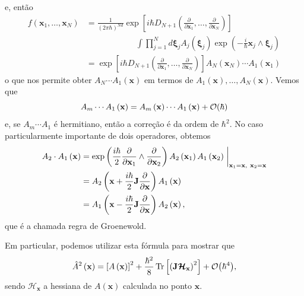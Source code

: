 \documentclass[
	12pt,
	oneside,			%
	a4paper,			%
	english,			%
	brazil				%
	]{abntex2}
\theoremstyle{definition}
\begin{document}
e, então
\begin{equation}
    \begin{aligned}
        f(\mathbf{x}_1,\ldots,\mathbf{x}_N) &= \frac{1}{\left(2 \pi \hbar\right)^{Nd}}\exp \left[i \hbar D_{N+1}\left(\frac{\partial}{\partial \mathbf{x}_1},\ldots,\frac{\partial}{\partial \mathbf{x}_N}\right)\right] \\ & \qquad \qquad \qquad \int \prod_{j=1}^N d \boldsymbol{\xi}_j A_j \left(\boldsymbol{\xi}_j\right) \exp\left(-\frac{i}{\hbar} \mathbf{x}_j\wedge\boldsymbol{\xi}_j\right) \\
        &=\exp \left[i \hbar D_{N+1}\left(\frac{\partial}{\partial \mathbf{x}_1},\ldots,\frac{\partial}{\partial \mathbf{x}_N}\right)\right] A_N\left(\mathbf{x}_N\right) \cdots A_1\left(\mathbf{x}_1\right)
    \end{aligned}
\end{equation}
o que nos permite obter $A_N \cdots A_1 \left(\mathbf{x}\right)$ em termos de $A_1\left(\mathbf{x}\right),\ldots,A_N\left(\mathbf{x}\right)$. Vemos que
\begin{equation}
    A_m \cdots A_1 \left(\mathbf{x}\right) = A_m \left( \mathbf{x} \right) \cdots A_1 \left( \mathbf{x} \right) + \order{\hbar}
\end{equation}
e, se $A_m \cdots A_1$ é hermitiano, então a correção é da ordem de $\hbar^2$.
No caso particularmente importante de dois operadores, obtemos
\begin{equation}
\label{groenewold}
    \begin{aligned}
        A_2 \cdot A_1 \left(\mathbf{x}\right) &= \exp\left(\frac{i \hbar}{2} \frac{\partial}{\partial \mathbf{x}_1} \wedge \frac{\partial}{\partial \mathbf{x}_2}\right) A_2\left(\mathbf{x}_1\right)  A_1\left(\mathbf{x}_2\right) \eval_{\mathbf{x}_1 = \mathbf{x},\ \mathbf{x}_2=\mathbf{x}}    \\ & =A_2\left(\mathbf{x}+\frac{i \hbar}{2}\mathbf{J}\frac{\partial}{\partial \mathbf{x}}\right)  A_1\left(\mathbf{x}\right) \\ & =A_1\left(\mathbf{x}-\frac{i \hbar}{2}\mathbf{J}\frac{\partial}{\partial \mathbf{x}}\right)  A_2\left(\mathbf{x}\right),
    \end{aligned}
\end{equation}
que é a chamada regra de Groenewold.

Em particular, podemos utilizar esta fórmula para mostrar que
\begin{equation}
\label{expansão segunda ordem}
    \hat{A}^2 \left( \mathbf{x}\right) = \left[A\left( \mathbf{x}\right)\right]^2 + \frac{\hbar^2}{8} \Tr \left[\left( \mathbf{J} \boldsymbol{\mathcal{H}_{\mathbf{x}}} \right)^2\right] + \order{\hbar^4},
\end{equation}
sendo $\mathcal{H}_{\mathbf{x}}$ a hessiana de $A\left( \mathbf{x}\right)$ calculada no ponto $\mathbf{x}$.
\end{document}
